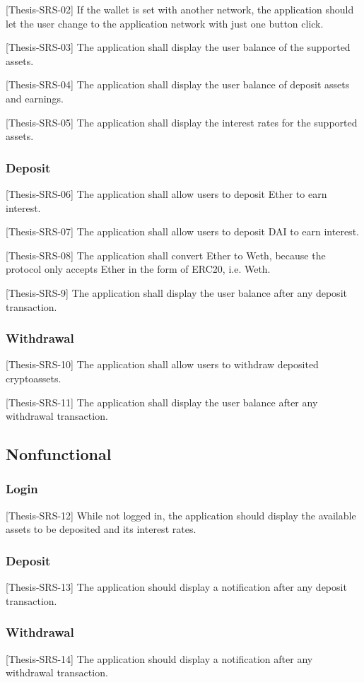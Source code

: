 \documentclass[11pt,a4paper]{report}
\begin{document}
[Thesis-SRS-02]  If the wallet is set with another network, the application should let the user change to the application network with just one button click.

[Thesis-SRS-03] The application shall display the user balance of the supported assets.

[Thesis-SRS-04] The application shall display the user balance of deposit assets and earnings.

[Thesis-SRS-05] The application shall display the interest rates for the supported assets.
\subsubsection{Deposit}
[Thesis-SRS-06] The application shall allow users to deposit Ether to earn interest.

[Thesis-SRS-07] The application shall allow users to deposit DAI to earn interest.

[Thesis-SRS-08] The application shall convert Ether to Weth, because the protocol only accepts Ether in the form of ERC20, i.e. Weth.

[Thesis-SRS-9] The application shall display the user balance after any deposit transaction.

\subsubsection{Withdrawal}
[Thesis-SRS-10] The application shall allow users to withdraw deposited cryptoassets.

[Thesis-SRS-11] The application shall display the user balance after any withdrawal transaction.

\subsection{Nonfunctional}
\subsubsection{Login}
[Thesis-SRS-12] While not logged in, the application should display the available assets to be deposited and its interest rates. 
\subsubsection{Deposit}
[Thesis-SRS-13] The application should display a notification after any deposit transaction.
\subsubsection{Withdrawal}
[Thesis-SRS-14] The application should display a notification after any withdrawal transaction.
\end{document}
